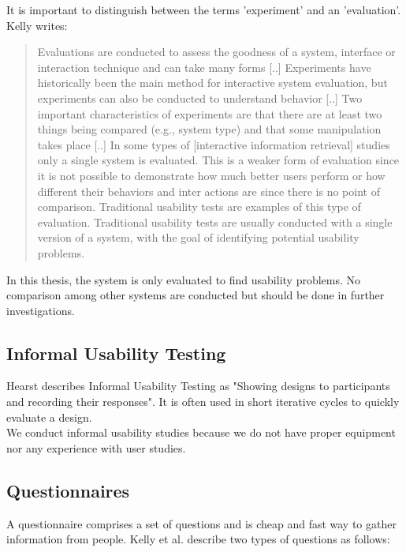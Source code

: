 \documentclass[11pt]{report}
\begin{document}
It is important to distinguish between the terms 'experiment' and an 'evaluation'. Kelly \cite{Kelly2007} writes:
\begin{quote}
Evaluations are conducted to assess the goodness of a system, interface or interaction technique and can take many forms [..] Experiments have historically been the main method for interactive system evaluation, but experiments can also be conducted to understand behavior [..] Two important characteristics of experiments are that there are at least two things being compared (e.g., system type) and that some manipulation takes place [..] In some types of [interactive information retrieval] studies only a single system is evaluated. This is a weaker form of evaluation since it is not possible to demonstrate how much better users perform or how different their behaviors and inter actions are since there is no point of comparison. Traditional usability tests are examples of this type of evaluation. Traditional usability tests are usually conducted with a single version of a system, with the goal of identifying potential usability problems.	
\end{quote}

In this thesis, the system is only evaluated to find usability problems. No comparison among other systems are conducted but should be done in further investigations.

\subsection{Informal Usability Testing}

Hearst \cite{Hearst2009} describes Informal Usability Testing as "Showing designs to participants and recording their responses". It is often used in short iterative cycles to quickly evaluate a design. \\

 We conduct informal usability studies because we do not have proper equipment nor any experience with user studies.

\subsection{Questionnaires}

A questionnaire comprises a set of questions and is cheap and fast way to gather information from people. Kelly et al. \cite{Kelly2008} describe two types of questions as follows:
\end{document}
